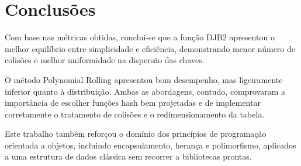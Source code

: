 \documentclass[12pt,a4paper]{abntex2}
\begin{document}
\section{Conclusões}
Com base nas métricas obtidas, conclui-se que a função DJB2 apresentou o melhor equilíbrio entre simplicidade e eficiência, demonstrando menor número de colisões e melhor uniformidade na dispersão das chaves.

O método Polynomial Rolling apresentou bom desempenho, mas ligeiramente inferior quanto à distribuição. Ambas as abordagens, contudo, comprovaram a importância de escolher funções hash bem projetadas e de implementar corretamente o tratamento de colisões e o redimensionamento da tabela.

Este trabalho também reforçou o domínio dos princípios de programação orientada a objetos, incluindo encapsulamento, herança e polimorfismo, aplicados a uma estrutura de dados clássica sem recorrer a bibliotecas prontas.

\newpage
\end{document}

